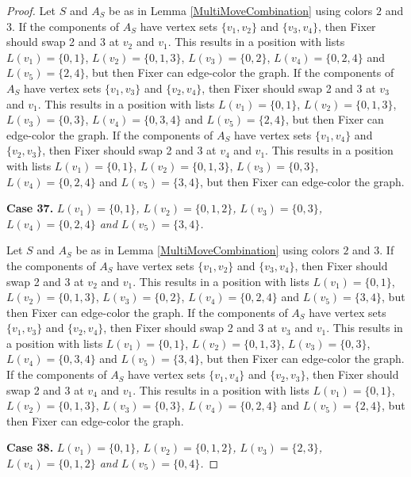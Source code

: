 \documentclass[12pt]{amsart}
\theoremstyle{plain}
\theoremstyle{definition}
\theoremstyle{remark}
\begin{document}
\begin{proof}
Let $S$ and $A_S$ be as in Lemma \ref{MultiMoveCombination} using colors $2$ and $3$. If the components of $A_S$ have vertex sets $\{v_1, v_2\}$ and $\{v_3, v_4\}$, then Fixer should swap 2 and 3 at $v_2$ and $v_1$. This results in a position with lists $L(v_1) = \{0, 1\}$, $L(v_2) = \{0, 1, 3\}$, $L(v_3) = \{0, 2\}$, $L(v_4) = \{0, 2, 4\}$ and $L(v_5) = \{2, 4\}$, but then Fixer can edge-color the graph.
If the components of $A_S$ have vertex sets $\{v_1, v_3\}$ and $\{v_2, v_4\}$, then Fixer should swap 2 and 3 at $v_3$ and $v_1$. This results in a position with lists $L(v_1) = \{0, 1\}$, $L(v_2) = \{0, 1, 3\}$, $L(v_3) = \{0, 3\}$, $L(v_4) = \{0, 3, 4\}$ and $L(v_5) = \{2, 4\}$, but then Fixer can edge-color the graph.
If the components of $A_S$ have vertex sets $\{v_1, v_4\}$ and $\{v_2, v_3\}$, then Fixer should swap 2 and 3 at $v_4$ and $v_1$. This results in a position with lists $L(v_1) = \{0, 1\}$, $L(v_2) = \{0, 1, 3\}$, $L(v_3) = \{0, 3\}$, $L(v_4) = \{0, 2, 4\}$ and $L(v_5) = \{3, 4\}$, but then Fixer can edge-color the graph.

\noindent\textbf{Case 37.  }\textit{$L(v_1) = \{0, 1\}$, $L(v_2) = \{0, 1, 2\}$, $L(v_3) = \{0, 3\}$, $L(v_4) = \{0, 2, 4\}$ and $L(v_5) = \{3, 4\}$.}

Let $S$ and $A_S$ be as in Lemma \ref{MultiMoveCombination} using colors $2$ and $3$. If the components of $A_S$ have vertex sets $\{v_1, v_2\}$ and $\{v_3, v_4\}$, then Fixer should swap 2 and 3 at $v_2$ and $v_1$. This results in a position with lists $L(v_1) = \{0, 1\}$, $L(v_2) = \{0, 1, 3\}$, $L(v_3) = \{0, 2\}$, $L(v_4) = \{0, 2, 4\}$ and $L(v_5) = \{3, 4\}$, but then Fixer can edge-color the graph.
If the components of $A_S$ have vertex sets $\{v_1, v_3\}$ and $\{v_2, v_4\}$, then Fixer should swap 2 and 3 at $v_3$ and $v_1$. This results in a position with lists $L(v_1) = \{0, 1\}$, $L(v_2) = \{0, 1, 3\}$, $L(v_3) = \{0, 3\}$, $L(v_4) = \{0, 3, 4\}$ and $L(v_5) = \{3, 4\}$, but then Fixer can edge-color the graph.
If the components of $A_S$ have vertex sets $\{v_1, v_4\}$ and $\{v_2, v_3\}$, then Fixer should swap 2 and 3 at $v_4$ and $v_1$. This results in a position with lists $L(v_1) = \{0, 1\}$, $L(v_2) = \{0, 1, 3\}$, $L(v_3) = \{0, 3\}$, $L(v_4) = \{0, 2, 4\}$ and $L(v_5) = \{2, 4\}$, but then Fixer can edge-color the graph.

\noindent\textbf{Case 38.  }\textit{$L(v_1) = \{0, 1\}$, $L(v_2) = \{0, 1, 2\}$, $L(v_3) = \{2, 3\}$, $L(v_4) = \{0, 1, 2\}$ and $L(v_5) = \{0, 4\}$.}


\end{proof}
\end{document}
